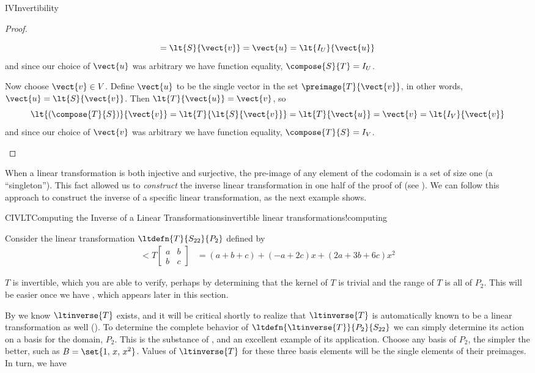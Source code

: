 \begin{subsect}{IV}{Invertibility}
\begin{proof}
\begin{para}
\begin{equation*}
=\lt{S}{\vect{v}}
=\vect{u}
=\lt{I_U}{\vect{u}}
\end{equation*}
%
and since our choice of $\vect{u}$ was arbitrary we have function equality, $\compose{S}{T}=I_U$.\end{para}
%
\begin{para}Now choose $\vect{v}\in V$.  Define $\vect{u}$ to be the single vector in the set $\preimage{T}{\vect{v}}$, in other words, $\vect{u}=\lt{S}{\vect{v}}$.  Then $\lt{T}{\vect{u}}=\vect{v}$, so
%
\begin{equation*}
\lt{\left(\compose{T}{S}\right)}{\vect{v}}
=\lt{T}{\lt{S}{\vect{v}}}
=\lt{T}{\vect{u}}
=\vect{v}
=\lt{I_V}{\vect{v}}
\end{equation*}
%
%
and since our choice of $\vect{v}$ was arbitrary we have function equality, $\compose{T}{S}=I_V$.\end{para}
%
\end{proof}
%
\begin{para}When a linear transformation is both injective and surjective, the pre-image of any element of the codomain is a set of size one (a ``singleton'').  This fact allowed us to {\em construct} the inverse linear transformation in one half of the proof of  (see ).  We can follow this approach to construct the inverse of a specific linear transformation, as the next example shows.\end{para}
%
\begin{example}{CIVLT}{Computing the Inverse of a Linear Transformations}{invertible linear transformations!computing}
%
\begin{para}Consider the linear transformation  $\ltdefn{T}{S_{22}}{P_2}$ defined by
%
\begin{align*}
\lt{T}{\begin{bmatrix}a&b\\b&c\end{bmatrix}}
&=
\left(a+b+c\right)
+
\left(-a+2c\right)x
+
\left(2a+3b+6c\right)x^2
\end{align*}\end{para}
%
\begin{para}$T$ is invertible, which you are able to verify, perhaps by determining that the kernel of $T$ is trivial and the range of $T$ is all of $P_2$.  This will be easier once we have , which appears later in this section.\end{para}
%
\begin{para}By  we know $\ltinverse{T}$ exists, and it will be critical shortly to realize that $\ltinverse{T}$ is automatically known to be a linear transformation as well ().  To determine the complete behavior of $\ltdefn{\ltinverse{T}}{P_2}{S_{22}}$ we can simply determine its action on a basis for the domain, $P_2$.  This is the substance of , and an excellent example of its application.   Choose any basis of $P_2$, the simpler the better, such as $B=\set{1,\,x,\,x^2}$.  Values of $\ltinverse{T}$ for these three basis elements will be the single elements of their preimages.  In turn, we have

\end{para}
\end{example}
\end{subsect}
